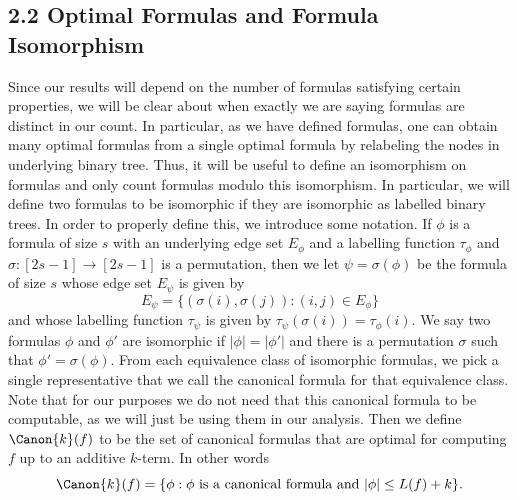 \subsection*{2.2 Optimal Formulas and Formula Isomorphism}
Since our results will depend on the number of formulas satisfying certain properties, we will be clear about when exactly we are saying formulas are distinct in our count.
In particular, as we have defined formulas, one can obtain many optimal formulas from a single optimal formula by relabeling the nodes in underlying binary tree.
Thus, it will be useful to define an isomorphism on formulas and only count formulas modulo this isomorphism. In particular, we will define two formulas to be isomorphic if they are isomorphic as labelled binary trees.
In order to properly define this, we introduce some notation. If $\phi$ is a formula of size $s$ with an underlying edge set $E_\phi$ and a labelling function $\tau_\phi$ and $\sigma:[2s-1]\to[2s-1]$ is a permutation, then we let $\psi=\sigma(\phi)$ be the formula of size $s$ whose edge set $E_\psi$ is given by
\[E_\psi=\{(\sigma(i),\sigma(j)):(i,j)\in E_\phi\}\]
and whose labelling function $\tau_\psi$ is given by $\tau_\psi(\sigma(i))=\tau_\phi(i)$.
We say two formulas $\phi$ and $\phi'$ are isomorphic if $|\phi|=|\phi'|$ and there is a permutation $\sigma$ such that $\phi'=\sigma(\phi)$.
From each equivalence class of isomorphic formulas, we pick a single representative that we call the canonical formula for that equivalence class. Note that for our purposes we do not need that this canonical formula to be computable, as we will just be using them in our analysis. Then we define $\Canon{k}(f)$ to be the set of canonical formulas that are optimal for computing $f$ up to an additive $k$-term. In other words
\[\Canon{k}(f)=\{\phi:\phi\text{ is a canonical formula and }|\phi|\leq L(f)+k\}.\]
